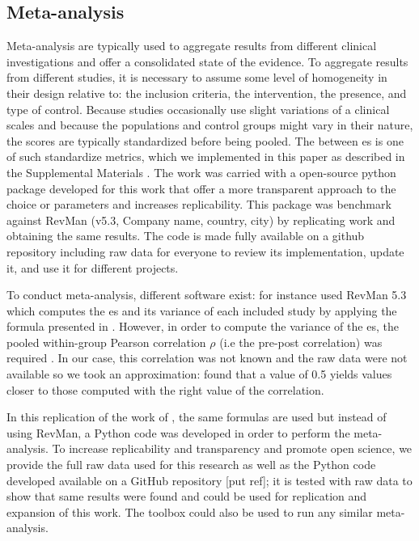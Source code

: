 \subsection{Meta-analysis}

Meta-analysis are typically used to aggregate results from different clinical investigations and offer a consolidated state of the evidence. To aggregate results from different studies, it is necessary to assume some level of homogeneity in their design relative to: the inclusion criteria, the intervention, the presence, and type of control. Because studies occasionally use slight variations of a clinical scales and because the populations and control groups might vary in their nature, the scores are typically standardized before being pooled. The between \gls{es} is one of such standardize metrics, which we implemented in this paper as described in the Supplemental Materials . The work was carried with a open-source python package developed for this work that offer a more transparent approach to the choice or parameters and increases replicability. This package was benchmark against RevMan (v5.3, Company name, country, city) by replicating \citet['s]{Cortese2016} work and obtaining the same results. The code is made fully available on a github repository \cite{} including raw data for everyone to review its implementation, update it, and use it for different projects. 


To conduct meta-analysis, different software exist: for instance \citet{Cortese2016} used RevMan 5.3 \citep{RevMan} which computes the \gls{es} and its 
variance of each included study by applying the formula presented in \citet{Morris2008}. However, in order to compute the variance of the \gls{es}, 
the pooled within-group Pearson correlation $\rho$ (i.e the pre-post correlation) was required 
\citep{James2013}. In our case, this correlation was not known and the raw data were not available so we took an
 approximation: \citet{Balk2012} found that a value of 0.5 yields values closer to those computed with the right value of the correlation. 

In this replication of the work of \citeauthor{Cortese2016}, the same
formulas are used \citep{Borenstein2009} but instead of using RevMan, a Python code was developed in order to perform the meta-analysis. To increase 
replicability and transparency and promote open science, we provide the full raw data used for this research as well as the Python code 
developed available on a GitHub repository [put ref]; it is tested with \citet{Cortese2016} raw data to show that same results were found and could 
be used for replication and expansion of this work. The toolbox could also be used to run any similar meta-analysis.  
 

